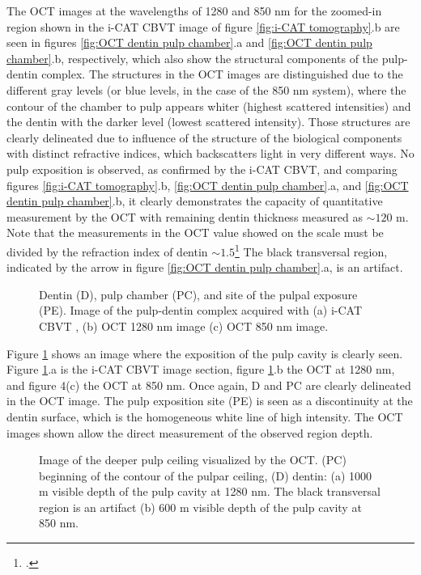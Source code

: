 \documentclass[12pt,twoside,english]{book}
\renewcommand{\~}{\perispomeni}%
\DeclareRobustCommand{\textgreek}[1]{\leavevmode{\greektext #1}}
\numberwithin{equation}{section}
\numberwithin{figure}{section}
\begin{document}
The OCT images at the wavelengths of 1280 and 850 nm for the zoomed-in region shown in the i-CAT CBVT image of figure \ref{fig:i-CAT tomography}.b are seen in figures \ref{fig:OCT dentin pulp chamber}.a and \ref{fig:OCT dentin pulp chamber}.b, respectively, which also show the structural components of the pulp-dentin complex. The structures in the OCT images are distinguished due to the different gray levels (or blue levels, in the case of the 850 nm system), where the contour of the chamber to pulp appears whiter (highest scattered intensities) and the dentin with the darker level (lowest scattered intensity). Those structures are clearly delineated due to influence of the structure of the biological components with distinct refractive indices, which backscatters light in very different ways. No pulp exposition is observed, as confirmed by the i-CAT CBVT, and comparing figures \ref{fig:i-CAT tomography}.b, \ref{fig:OCT dentin pulp chamber}.a, and \ref{fig:OCT dentin pulp chamber}.b, it clearly demonstrates the capacity of quantitative measurement by the OCT with remaining dentin thickness measured as $\sim120$ \textgreek{m}m. Note that the measurements in the OCT value showed on the scale must be divided by the refraction index of dentin $\sim1.5$\footcite{Colston:1998p1677} The black transversal region, indicated by the arrow in figure \ref{fig:OCT dentin pulp chamber}.a, is an artifact.
\begin{figure}[h]
\centering{}
\caption{Dentin (D), pulp chamber (PC), and site of the pulpal exposure (PE). Image of the pulp-dentin complex acquired with (a) i-CAT CBVT , (b) OCT 1280 nm image (c) OCT 850 nm image.\label{fig:pulp exposure}}
\end{figure}

Figure \ref{fig:pulp exposure} shows an image where the exposition of the pulp cavity is clearly seen. Figure \ref{fig:pulp exposure}.a is the i-CAT CBVT image section, figure \ref{fig:pulp exposure}.b the OCT at 1280 nm, and figure 4(c) the OCT at 850 nm. Once again, D and PC are clearly delineated in the OCT image. The pulp exposition site (PE) is seen as a discontinuity at the dentin surface, which is the homogeneous white line of high intensity. The OCT images shown allow the direct measurement of the observed region depth.
\begin{figure}[h]
\centering{}
\caption{Image of the deeper pulp ceiling visualized by the OCT. (PC) beginning of the contour of the pulpar ceiling, (D) dentin: (a) 1000 \textgreek{m}m visible depth of the pulp cavity at 1280 nm. The black transversal region is an artifact (b) 600 \textgreek{m}m visible depth of the pulp cavity at 850 nm.\label{fig:deep ceiling}}
\end{figure}
\end{document}

